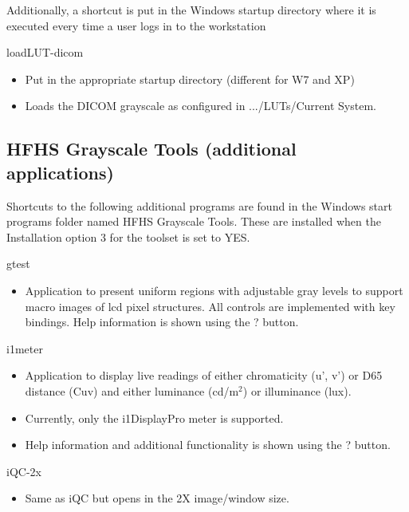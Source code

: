 Additionally, a shortcut is put in the Windows startup directory where it is executed every time a user logs in to the workstation

loadLUT-dicom
\begin{itemize}
\item Put in the appropriate startup directory (different for W7 and XP) 
\item Loads the DICOM grayscale as configured in .../LUTs/Current System.
\end{itemize} 

\subsection{HFHS Grayscale Tools (additional applications)}
\label{sec:addapps}

Shortcuts to the following additional programs are found in the Windows start programs folder named \textnormal{HFHS Grayscale Tools}. These are installed when the Installation option 3 for the toolset is set to YES. 

gtest
\begin{itemize}
\item Application to present uniform regions with adjustable gray levels to support macro images of lcd pixel structures. All controls are implemented with key bindings. Help information is shown using the ? button.
\end{itemize}

i1meter
\begin{itemize}
\item Application to display live readings of either chromaticity (u', v') or D65 distance (Cuv) and either luminance (cd/m$^2$) or illuminance (lux).
\item Currently, only the i1DisplayPro meter is supported.
\item Help information and additional functionality is shown using the ? button.
\end{itemize}

iQC-2x
\begin{itemize}
\item Same as iQC but opens in the 2X image/window size.
\end{itemize}

